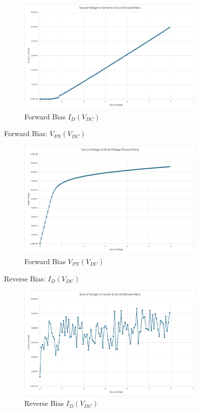 \documentclass[12pt]{article}
\begin{document}
\begin{itemize}
\begin{figure}[h!tbp]
    \centering
    \includegraphics[width=0.8\textwidth]{I_D_forward.png}
    \caption{Forward Bias $I_D(V_{DC})$}
    \label{fig:forward-bias_I}
\end{figure}

Forward Bias: $V_{PN}(V_{DC})$
\begin{figure}[h!tbp]
    \centering
    \includegraphics[width=0.8\textwidth]{V_PN_forward.png}
    \caption{Forward Bias $V_{PN}(V_{DC})$}
    \label{fig:forward-bias_V}
\end{figure}

\newpage

Reverse Bias: $I_D(V_{DC})$
\begin{figure}[h!tbp]
    \centering
    \includegraphics[width=0.8\textwidth]{I_D_reverse.png}
    \caption{Reverse Bias $I_D(V_{DC})$}
    \label{fig:reverse-bias_I}
\end{figure}


\end{itemize}
\end{document}
